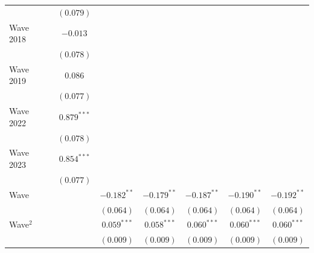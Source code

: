 \documentclass[
  12pt,
]{article}
\begin{document}
\begin{table}
\begin{center}
{\begin{tabular}{l c c c c c c c}
                                                      &                & $(0.079)$      &                &                &                &               &                \\
\quad Wave 2018                                       &                & $-0.013$       &                &                &                &               &                \\
                                                      &                & $(0.078)$      &                &                &                &               &                \\
\quad Wave 2019                                       &                & $0.086$        &                &                &                &               &                \\
                                                      &                & $(0.077)$      &                &                &                &               &                \\
\quad Wave 2022                                       &                & $0.879^{***}$  &                &                &                &               &                \\
                                                      &                & $(0.078)$      &                &                &                &               &                \\
\quad Wave 2023                                       &                & $0.854^{***}$  &                &                &                &               &                \\
                                                      &                & $(0.077)$      &                &                &                &               &                \\
Wave                                                  &                &                & $-0.182^{**}$  & $-0.179^{**}$  & $-0.187^{**}$  & $-0.190^{**}$ & $-0.192^{**}$  \\
                                                      &                &                & $(0.064)$      & $(0.064)$      & $(0.064)$      & $(0.064)$     & $(0.064)$      \\
Wave$^2$                                              &                &                & $0.059^{***}$  & $0.058^{***}$  & $0.060^{***}$  & $0.060^{***}$ & $0.060^{***}$  \\
                                                      &                &                & $(0.009)$      & $(0.009)$      & $(0.009)$      & $(0.009)$     & $(0.009)$      \\

\end{tabular}}
\end{center}
\end{table}
\end{document}
